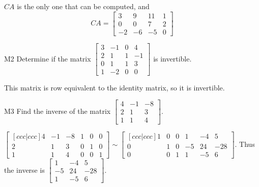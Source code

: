 \documentclass{sbgLAsemi}
\begin{document}
\begin{solution}
$CA$ is the only one that can be computed, and 
$$CA = \begin{bmatrix} 3 & 9 & 11 & 1 \\ 0 & 0 & 7 & 2 \\ -2 & - 6 & -5 & 0 \end{bmatrix}$$
\end{solution}

\begin{problem}{M2}
Determine if the matrix $\begin{bmatrix} 3 & -1 & 0 & 4 \\ 2 & 1 & 1 & -1 \\ 0 & 1 & 1 & 3 \\ 1 & -2 & 0 & 0 \end{bmatrix}$ is invertible.
\end{problem}
\begin{solution}
This matrix is row equivalent to the identity matrix, so it is invertible.
\end{solution}

\begin{problem}{M3}
  Find the inverse of the matrix
  \(\begin{bmatrix}
    4 & -1 & -8  \\
    2 & 1 & 3  \\
    1 & 1 & 4
  \end{bmatrix}\).
\end{problem}
\begin{solution}
\(\begin{bmatrix}[ccc|ccc]
  4 & -1 & -8 & 1 & 0 & 0  \\
  2 & 1 & 3   & 0 & 1 & 0 \\
  1 & 1 & 4   & 0 & 0 & 1
\end{bmatrix}\sim\begin{bmatrix}[ccc|ccc]
  1 & 0 & 0 & 1 & -4 & 5 \\
  0 & 1 & 0 & -5 & 24 & -28 \\
  0 & 0 & 1 & 1 & -5 & 6
\end{bmatrix}\). Thus the inverse is
\(\begin{bmatrix}
  1 & -4 & 5  \\
  -5 & 24 & -28  \\
  1 & -5 & 6
\end{bmatrix}\).
\end{solution}
\end{document}
